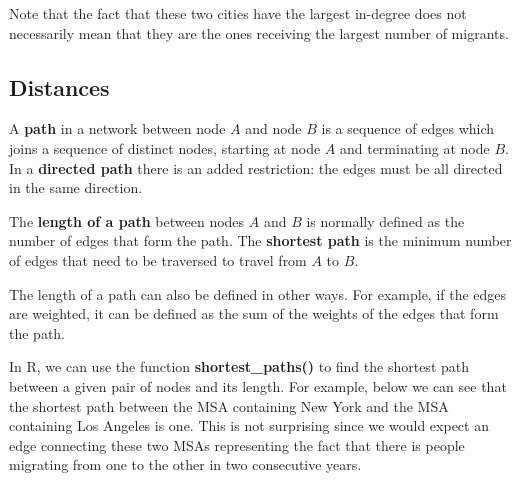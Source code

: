 \documentclass[
  letterpaper,
  DIV=11,
  numbers=noendperiod]{scrreprt}
\newenvironment{Shaded}{\begin{snugshade}}{\end{snugshade}}
\newcommand{\AttributeTok}[1]{\textcolor[rgb]{0.40,0.45,0.13}{#1}}
\newcommand{\CommentTok}[1]{\textcolor[rgb]{0.37,0.37,0.37}{#1}}
\newcommand{\ConstantTok}[1]{\textcolor[rgb]{0.56,0.35,0.01}{#1}}
\newcommand{\FunctionTok}[1]{\textcolor[rgb]{0.28,0.35,0.67}{#1}}
\newcommand{\NormalTok}[1]{\textcolor[rgb]{0.00,0.23,0.31}{#1}}
\newcommand{\SpecialCharTok}[1]{\textcolor[rgb]{0.37,0.37,0.37}{#1}}
\newcommand{\StringTok}[1]{\textcolor[rgb]{0.13,0.47,0.30}{#1}}
\begin{document}
Note that the fact that these two cities have the largest in-degree does
not necessarily mean that they are the ones receiving the largest number
of migrants.

\hypertarget{distances}{%
\subsection{Distances}\label{distances}}

A \textbf{path} in a network between node \(A\) and node \(B\) is a
sequence of edges which joins a sequence of distinct nodes, starting at
node \(A\) and terminating at node \(B\). In a \textbf{directed path}
there is an added restriction: the edges must be all directed in the
same direction.

The \textbf{length of a path} between nodes \(A\) and \(B\) is normally
defined as the number of edges that form the path. The \textbf{shortest
path} is the minimum number of edges that need to be traversed to travel
from \(A\) to \(B\).

The length of a path can also be defined in other ways. For example, if
the edges are weighted, it can be defined as the sum of the weights of
the edges that form the path.

In R, we can use the function \textbf{shortest\_paths()} to find the
shortest path between a given pair of nodes and its length. For example,
below we can see that the shortest path between the MSA containing New
York and the MSA containing Los Angeles is one. This is not surprising
since we would expect an edge connecting these two MSAs representing the
fact that there is people migrating from one to the other in two
consecutive years.

\begin{Shaded}
\end{Shaded}
\end{document}

